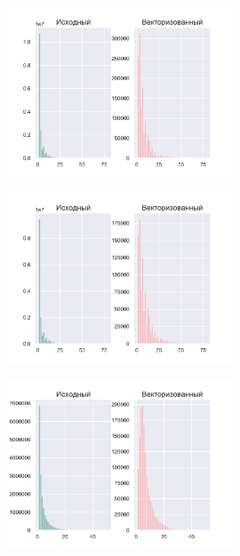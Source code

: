 \begin{figure}[ht]
	\centering
		\includegraphics[width=0.6\textwidth]{./pics/text_4_vec_irreg/shell_k_4.pdf}
	\caption{}
	\label{fig:text_4_vec_irreg_shell_k_4}
\end{figure}

\begin{figure}[ht]
	\centering
		\includegraphics[width=0.6\textwidth]{./pics/text_4_vec_irreg/shell_k_15.pdf}
	\caption{}
	\label{fig:text_4_vec_irreg_shell_k_15}
\end{figure}

\begin{figure}[ht]
	\centering
		\includegraphics[width=0.6\textwidth]{./pics/text_4_vec_irreg/hibbard_k_3.pdf}
	\caption{}
	\label{fig:text_4_vec_irreg_hibbard_k_3}
\end{figure}


